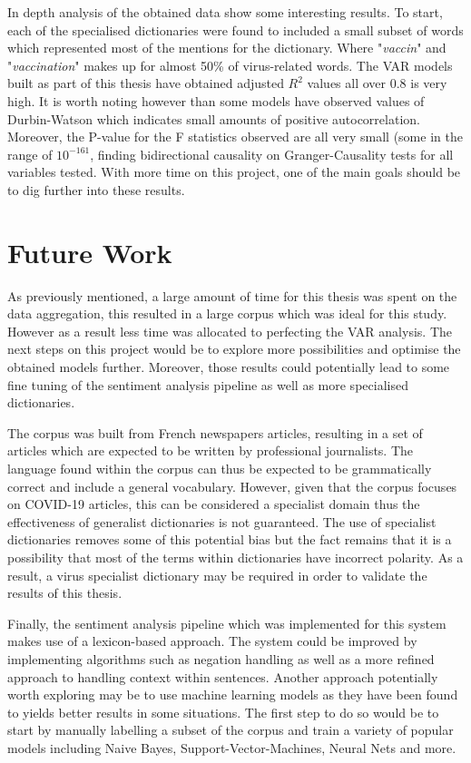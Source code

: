 In depth analysis of the obtained data show some interesting results. To start, each of the specialised dictionaries were found to included a small subset of words which represented most of the mentions for the dictionary. Where "\emph{vaccin}" and "\emph{vaccination}" makes up for almost 50\% of virus-related words. The VAR models built as part of this thesis have obtained adjusted $R^2$ values all over 0.8 is very high. It is worth noting however than some models have observed values of Durbin-Watson which indicates small amounts of positive autocorrelation. Moreover, the P-value for the F statistics observed are all very small (some in the range of $10^{-161}$, finding bidirectional causality on Granger-Causality tests for all variables tested. With more time on this project, one of the main goals should be to dig further into these results.

\section{Future Work}

As previously mentioned, a large amount of time for this thesis was spent on the data aggregation, this resulted in a large corpus which was ideal for this study. However as a result less time was allocated to perfecting the VAR analysis. The next steps on this project would be to explore more possibilities and optimise the obtained models further. Moreover, those results could potentially lead to some fine tuning of the sentiment analysis pipeline as well as more specialised dictionaries.

The corpus was built from French newspapers articles, resulting in a set of articles which are expected to be written by professional journalists. The language found within the corpus can thus be expected to be grammatically correct and include a general vocabulary. However, given that the corpus focuses on COVID-19 articles, this can be considered a specialist domain thus the effectiveness of generalist dictionaries is not guaranteed. The use of specialist dictionaries removes some of this potential bias but the fact remains that it is a possibility that most of the terms within dictionaries have incorrect polarity. As a result, a virus specialist dictionary may be required in order to validate the results of this thesis.

Finally, the sentiment analysis pipeline which was implemented for this system makes use of a lexicon-based approach. The system could be improved by implementing algorithms such as negation handling as well as a more refined approach to handling context within sentences. Another approach potentially worth exploring may be to use machine learning models as they have been found to yields better results in some situations. The first step to do so would be to start by manually labelling a subset of the corpus and train a variety of popular models including Naive Bayes, Support-Vector-Machines, Neural Nets and more.

